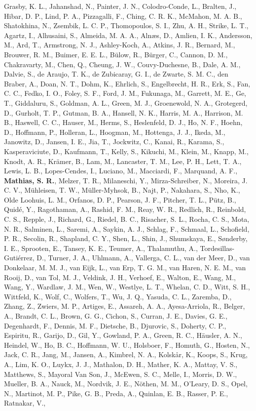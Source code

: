\documentclass[10pt]{article}
\makeatletter
\newlength{\bibhang}
\newlength{\bibsep}
 {\@listi \global\bibsep\itemsep \global\advance\bibsep by\parsep}
\newenvironment{bibsection}%
        {\vspace{-\baselineskip}\begin{list}{}{%
       \setlength{\leftmargin}{\bibhang}%
       \setlength{\itemindent}{-\leftmargin}%
       \setlength{\itemsep}{\bibsep}%
       \setlength{\parsep}{\z@}%
        \setlength{\partopsep}{0pt}%
        \setlength{\topsep}{0pt}}}
        {\end{list}\vspace{-.6\baselineskip}}
\makeatother
\begin{document}
\begin{bibsection}
\item Grasby, K. L., Jahanshad, N., Painter, J. N., Colodro-Conde, L., Bralten, J., Hibar, D. P., Lind, P. A., Pizzagalli, F., Ching, C. R. K., McMahon, M. A. B., Shatokhina, N., Zsembik, L. C. P., Thomopoulos, S. I., Zhu, A. H., Strike, L. T., Agartz, I., Alhusaini, S., Almeida, M. A. A., Alnæs, D., Amlien, I. K., Andersson, M., Ard, T., Armstrong, N. J., Ashley-Koch, A., Atkins, J. R., Bernard, M., Brouwer, R. M., Buimer, E. E. L., Bülow, R., Bürger, C., Cannon, D. M., Chakravarty, M., Chen, Q., Cheung, J. W., Couvy-Duchesne, B., Dale, A. M., Dalvie, S., de Araujo, T. K., de Zubicaray, G. I., de Zwarte, S. M. C., den Braber, A., Doan, N. T., Dohm, K., Ehrlich, S., Engelbrecht, H. R., Erk, S., Fan, C. C., Fedko, I. O., Foley, S. F., Ford, J. M., Fukunaga, M., Garrett, M. E., Ge, T., Giddaluru, S., Goldman, A. L., Green, M. J., Groenewold, N. A., Grotegerd, D., Gurholt, T. P., Gutman, B. A., Hansell, N. K., Harris, M. A., Harrison, M. B., Haswell, C. C., Hauser, M., Herms, S., Heslenfeld, D. J., Ho, N. F., Hoehn, D., Hoffmann, P., Holleran, L., Hoogman, M., Hottenga, J. J., Ikeda, M., Janowitz, D., Jansen, I. E., Jia, T., Jockwitz, C., Kanai, R., Karama, S., Kasperaviciute, D., Kaufmann, T., Kelly, S., Kikuchi, M., Klein, M., Knapp, M., Knodt, A. R., Krämer, B., Lam, M., Lancaster, T. M., Lee, P. H., Lett, T. A., Lewis, L. B., Lopes-Cendes, I., Luciano, M., Macciardi, F., Marquand, A. F., \textbf{Mathias, S. R.}, Melzer, T. R., Milaneschi, Y., Mirza-Schreiber, N., Moreira, J. C. V., Mühleisen, T. W., Müller-Myhsok, B., Najt, P., Nakahara, S., Nho, K., Olde Loohuis, L. M., Orfanos, D. P., Pearson, J. F., Pitcher, T. L., Pütz, B., Quidé, Y., Ragothaman, A., Rashid, F. M., Reay, W. R., Redlich, R., Reinbold, C. S., Repple, J., Richard, G., Riedel, B. C., Risacher, S. L., Rocha, C. S., Mota, N. R., Salminen, L., Saremi, A., Saykin, A. J., Schlag, F., Schmaal, L., Schofield, P. R., Secolin, R., Shapland, C. Y., Shen, L., Shin, J., Shumskaya, E., Sønderby, I. E., Sprooten, E., Tansey, K. E., Teumer, A., Thalamuthu, A., Tordesillas-Gutiérrez, D., Turner, J. A., Uhlmann, A., Vallerga, C. L., van der Meer, D., van Donkelaar, M. M. J., van Eijk, L., van Erp, T. G. M., van Haren, N. E. M., van Rooij, D., van Tol, M. J., Veldink, J. H., Verhoef, E., Walton, E., Wang, M., Wang, Y., Wardlaw, J. M., Wen, W., Westlye, L. T., Whelan, C. D., Witt, S. H., Wittfeld, K., Wolf, C., Wolfers, T., Wu, J. Q., Yasuda, C. L., Zaremba, D., Zhang, Z., Zwiers, M. P., Artiges, E., Assareh, A. A., Ayesa-Arriola, R., Belger, A., Brandt, C. L., Brown, G. G., Cichon, S., Curran, J. E., Davies, G. E., Degenhardt, F., Dennis, M. F., Dietsche, B., Djurovic, S., Doherty, C. P., Espiritu, R., Garijo, D., Gil, Y., Gowland, P. A., Green, R. C., Häusler, A. N., Heindel, W., Ho, B. C., Hoffmann, W. U., Holsboer, F., Homuth, G., Hosten, N., Jack, C. R., Jang, M., Jansen, A., Kimbrel, N. A., Kolskår, K., Koops, S., Krug, A., Lim, K. O., Luykx, J. J., Mathalon, D. H., Mather, K. A., Mattay, V. S., Matthews, S., Mayoral Van Son, J., McEwen, S. C., Melle, I., Morris, D. W., Mueller, B. A., Nauck, M., Nordvik, J. E., Nöthen, M. M., O'Leary, D. S., Opel, N., Martinot, M. P., Pike, G. B., Preda, A., Quinlan, E. B., Rasser, P. E., Ratnakar, V., 
\end{bibsection}
\end{document}
